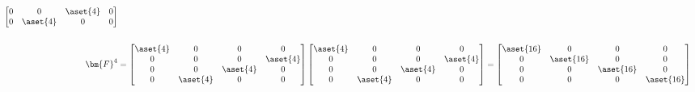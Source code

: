 \begin{itemize}
\begin{itemize}
\begin{align*}
\begin{bmatrix}
          0 & 0 & \aset{4} & 0\\
          0 & \aset{4} & 0 & 0
      \end{bmatrix} \\\\
      \bm{F}^4 &=
      \begin{bmatrix}
          \aset{4} & 0 & 0 & 0\\
          0 & 0 & 0 & \aset{4}\\
          0 & 0 & \aset{4} & 0\\
          0 & \aset{4} & 0 & 0
      \end{bmatrix}
      \begin{bmatrix}
          \aset{4} & 0 & 0 & 0\\
          0 & 0 & 0 & \aset{4}\\
          0 & 0 & \aset{4} & 0\\
          0 & \aset{4} & 0 & 0
      \end{bmatrix}
      =
      \begin{bmatrix}
          \aset{16} & 0 & 0 & 0\\
          0 & \aset{16} & 0 & 0\\
          0 & 0 & \aset{16} & 0\\
          0 & 0 & 0 & \aset{16}
      \end{bmatrix}
    \end{align*}


\end{itemize}
\end{itemize}
